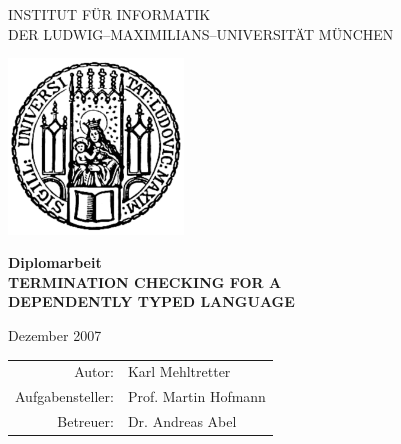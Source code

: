 \documentclass[a4paper,11pt]{report}
\theoremstyle{remark}
\begin{document}
\begin{titlepage}

\begin{center}

{\Huge INSTITUT F\"UR INFORMATIK\\[1mm]} %
DER LUDWIG--MAXIMILIANS--UNIVERSIT\"AT M\"UNCHEN\\

\vspace*{1cm}

\includegraphics[width=0.35\textwidth]{siegel.pdf}

\vspace*{2cm}

{\LARGE \textbf{Diplomarbeit}}\\

\vspace{2.0cm}
{\LARGE \textbf{TERMINATION CHECKING FOR A}}\\
\vspace*{3mm}
{\LARGE \textbf{DEPENDENTLY TYPED LANGUAGE}}\\

\vspace{2cm}

\Large{Dezember 2007}

\vspace{1.5cm}

  \begin{Large}
  \begin{tabular}{rl}
      Autor: &Karl Mehltretter\\
      Aufgabensteller: & Prof. Martin Hofmann\\
      Betreuer: & Dr. Andreas Abel\\
  \end{tabular}
  \end{Large}

\end{center}

\end{titlepage} 


\end{document}
